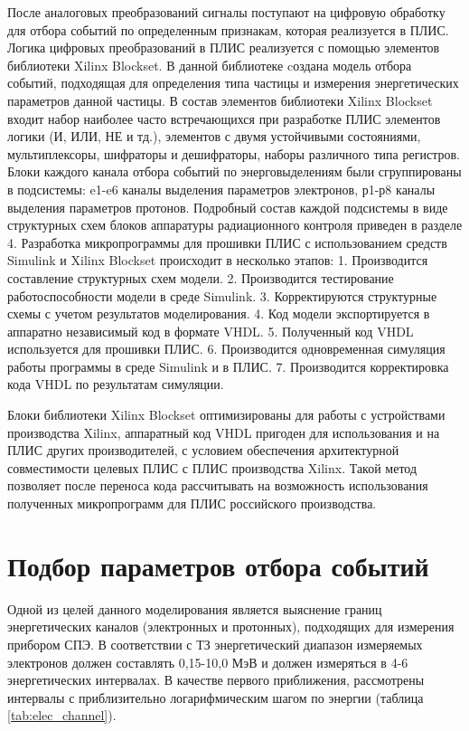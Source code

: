 После аналоговых преобразований сигналы поступают на цифровую обработку для отбора событий по определенным признакам, которая реализуется в ПЛИС. Логика цифровых преобразований в ПЛИС  реализуется с помощью элементов библиотеки Xilinx Blockset. В данной библиотеке cоздана модель отбора событий, подходящая для определения типа частицы и измерения энергетических параметров данной частицы. В состав элементов библиотеки Xilinx Blockset входит набор наиболее часто встречающихся при разработке ПЛИС элементов логики (И, ИЛИ, НЕ и тд.), элементов с двумя устойчивыми состояниями, мультиплексоры, шифраторы и дешифраторы, наборы различного типа регистров. Блоки каждого канала отбора событий по энерговыделениям были сгруппированы в подсистемы:
e1-e6 каналы выделения параметров электронов, 
р1-р8 каналы выделения параметров протонов. 
Подробный состав каждой подсистемы в виде структурных схем блоков аппаратуры радиационного контроля приведен в разделе 4.
Разработка микропрограммы для прошивки ПЛИС с использованием средств Simulink и Xilinx Blockset происходит в несколько этапов:
1.	Производится составление структурных схем модели.
2.	Производится тестирование работоспособности модели в среде Simulink.
3.	Корректируются структурные схемы с учетом результатов моделирования.
4.	Код модели экспортируется в аппаратно независимый код в формате VHDL.
5.	Полученный код VHDL используется для прошивки ПЛИС.
6.	Производится одновременная симуляция работы программы в среде Simulink и в ПЛИС.
7.	Производится корректировка кода VHDL по результатам симуляции.

Блоки библиотеки Xilinx Blockset оптимизированы для работы с устройствами производства Xilinx, аппаратный код VHDL пригоден для использования и на ПЛИС других производителей, с условием обеспечения архитектурной совместимости целевых ПЛИС с ПЛИС производства Xilinx. Такой метод позволяет после переноса кода рассчитывать на возможность использования полученных микропрограмм для ПЛИС российского производства.


\section{Подбор параметров отбора событий}

Одной из целей данного моделирования является выяснение границ энергетических каналов (электронных и протонных), подходящих для измерения прибором СПЭ. В соответствии с ТЗ энергетический диапазон измеряемых электронов должен составлять 0,15-10,0 МэВ и должен измеряться в 4-6 энергетических интервалах. В качестве первого приближения, рассмотрены интервалы с приблизительно логарифмическим шагом по энергии (таблица \ref{tab:elec_channel}).

